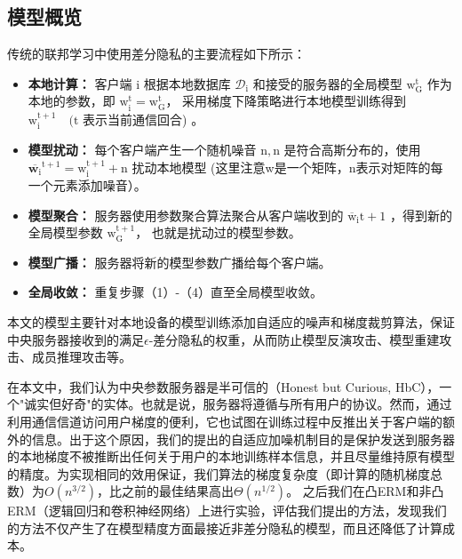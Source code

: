 \subsection{模型概览}
传统的联邦学习中使用差分隐私的主要流程如下所示：
\begin{itemize}
\item \textbf{本地计算：}
客户端 $\mathrm{i}$ 根据本地数据库 $\mathcal{D}_{\mathrm{i}}$ 和接受的服务器的全局模型 $\mathrm{w}_{\mathrm{G}}^{\mathrm{t}}$ 作为本地的参数，即 $\mathrm{w}_{\mathrm{i}}^{\mathrm{t}}=\mathrm{w}_{\mathrm{G}}^{\mathrm{t}}$， 采用梯度下降策略进行本地模型训练得到 $\mathrm{w}_{\mathrm{i}}^{\mathrm{t}+1} \quad(\mathrm{t}$ 表示当前通信回合) 。

\item \textbf{模型扰动：}
每个客户端产生一个随机噪音 $\mathrm{n},\mathrm{n}$ 是符合高斯分布的，使用 $\overline{\mathbf{w}_{\mathrm{i}}}^{\mathrm{t}+1}=\mathrm{w}_{\mathrm{i}}^{\mathrm{t}+1}+\mathrm{n}$ 扰动本地模型 (这里注意w是一个矩阵，n表示对矩阵的每一个元素添加噪音）。

\item \textbf{模型聚合：}
服务器使用参数聚合算法聚合从客户端收到的 $\overline{\mathrm{w}}_{\mathrm{i}} \mathrm{t}+1$ ，得到新的全局模型参数 $\mathrm{w}_{\mathrm{G}}^{\mathrm{t}+1}$， 也就是扰动过的模型参数。

\item \textbf{模型广播：}
服务器将新的模型参数广播给每个客户端。

\item \textbf{全局收敛：}
重复步骤（1）-（4）直至全局模型收敛。
\end{itemize}

本文的模型主要针对本地设备的模型训练添加自适应的噪声和梯度裁剪算法，保证中央服务器接收到的满足$\epsilon$-差分隐私的权重，从而防止模型反演攻击、模型重建攻击、成员推理攻击等。

在本文中，我们认为中央参数服务器是半可信的（Honest but Curious, HbC），一个"诚实但好奇"的实体。也就是说，服务器将遵循与所有用户的协议。然而，通过利用通信信道访问用户梯度的便利，它也试图在训练过程中反推出关于客户端的额外的信息。出于这个原因，我们的提出的自适应加噪机制目的是保护发送到服务器的本地梯度不被推断出任何关于用户的本地训练样本信息，并且尽量维持原有模型的精度。为实现相同的效用保证，我们算法的梯度复杂度（即计算的随机梯度总数）为$O\left(n^{3 / 2}\right)$，比之前的最佳结果高出$\Theta\left(n^{1 / 2}\right)$。 之后我们在凸ERM和非凸ERM（逻辑回归和卷积神经网络）上进行实验，评估我们提出的方法，发现我们的方法不仅产生了在模型精度方面最接近非差分隐私的模型，而且还降低了计算成本。

